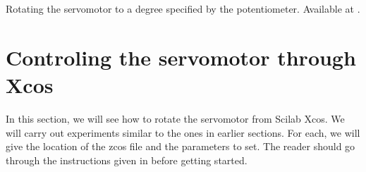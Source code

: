 \begin{scicode}
   {Rotating the servomotor to a degree specified by
    the potentiometer.  Available at .}
  \label{sci:servo-pot}
  
\end{scicode}


\section{Controling the servomotor through Xcos}
\label{sec:servo-xcos}
In this section, we will see how to rotate the servomotor from Scilab
Xcos.  We will carry out experiments similar to the ones in earlier
sections.  For each, we will give the location of the zcos file and
the parameters to set.  The reader should go through the instructions
given in  before getting started.

